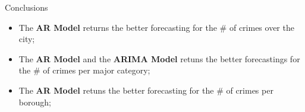 \documentclass[12pt]{beamer}
\begin{document}
        \begin{frame}{Conclusions}
            \begin{itemize}
                \item The \textbf{AR Model} returns the better forecasting for the \# of crimes over the city;
                \item The \textbf{AR Model} and the \textbf{ARIMA Model} retuns the better forecastings for the \# of
                crimes per major category;
                \item The \textbf{AR Model} retuns the better forecasting for the \# of crimes per borough;
            \end{itemize}
        \end{frame}
\end{document}
